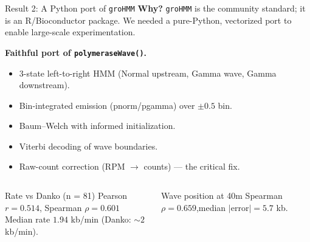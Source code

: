 \documentclass[aspectratio=169,10pt]{beamer}
\begin{document}
\begin{frame}{Result 2: A Python port of \texttt{groHMM}}
\textbf{Why?} \texttt{groHMM} is the community standard; it is an
R/Bioconductor package. We needed a pure-Python, vectorized port to
enable large-scale experimentation.

\medskip
\textbf{Faithful port of \texttt{polymeraseWave()}.}
\begin{itemize}\small
  \item 3-state left-to-right HMM
        (Normal upstream, Gamma wave, Gamma downstream).
  \item Bin-integrated emission (pnorm/pgamma) over $\pm 0.5$ bin.
  \item Baum--Welch with informed initialization.
  \item Viterbi decoding of wave boundaries.
  \item Raw-count correction (RPM $\to$ counts) --- the critical fix.
\end{itemize}

\begin{columns}[T]
\begin{block}{Rate vs Danko (n = 81)}
\small
Pearson $r = 0.514$, \quad Spearman $\rho = 0.601$ \\
Median rate $1.94$ kb/min (Danko: $\sim 2$ kb/min).
\end{block}
\begin{block}{Wave position at 40m}
\small Spearman $\rho = 0.659$,\quad median $|$error$| = 5.7$ kb.
\end{block}
\end{columns}
\end{frame}
\end{document}
